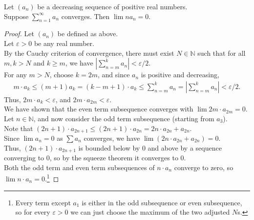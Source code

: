 \documentclass{article}
\newenvironment{theorem}[1]{\renewcommand\theinnercustomthm{#1}\innercustomthm}
  {\endinnercustomthm}
\begin{document}
\newpage{}
\begin{theorem}{2}
    Let $(a_n)$ be a decreasing sequence of positive real numbers. \\
    Suppose $\sum\limits_{n=1}^\infty a_n$ converges. Then $\lim n a_n = 0$. 
\end{theorem}
\begin{proof}
    Let $(a_n)$ be defined as above. \\
    Let $\varepsilon > 0$ be any real number. \\
    By the Cauchy criterion of convergence, there must exist $N \in \mathbb N$ such that for all $m, k > N$ and $k \ge m$, we have
    $\left|\sum\limits_{n=m}^k a_n \right| < \varepsilon/2$. \\
    For any $m>N$, choose $k = 2m$, and since $a_n$ is positive and decreasing,
    \begin{align*}m\cdot a_k\le (m+1)a_k=(k-m+1)\cdot a_k\le \sum_{n=m}^k a_n =\left|\sum_{n=m}^k a_n \right| < \varepsilon/2. \end{align*}
    Thus, $2m\cdot a_k < \varepsilon$, and $2m \cdot a_{2m} < \varepsilon$. \\
    We have shown that the even term subsequence converges with $\lim 2m\cdot a_{2m} = 0$. \\
    Let $n \in \mathbb N$, and now consider the odd term subsequence (starting from $a_3$). \\
    Note that $(2n+1) \cdot a_{2n+1}\le (2n+1)\cdot a_{2n} = 2n\cdot a_{2n} + a_{2n}$. \\
    Since $\lim a_n = 0$ as $\sum a_n$ converges, we have $\lim (2n\cdot a_{2n} + a_{2n}) = 0$. \\
    Thus, $(2n+1)\cdot a_{2n+1}$ is bounded below by $0$ and above by a sequence converging to $0$, so by the squeeze theorem it converges to $0$. \\
    Both the odd term and even term subsequences of $n\cdot a_n$ converge to zero, so $\lim n\cdot a_n = 0$.\footnote{Every term except $a_1$ is either in the odd subsequence or even subsequence, so for every $\varepsilon > 0$ we can just choose the maximum of the two adjusted $N$s.}
\end{proof}
\end{document}
